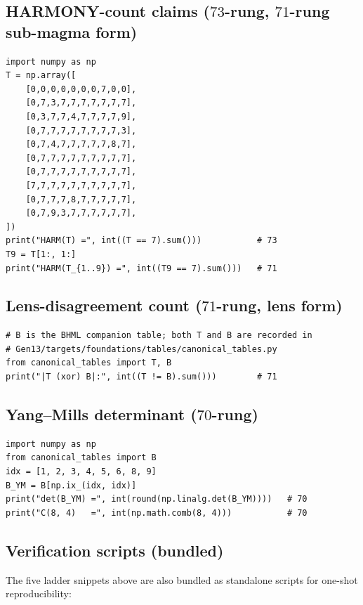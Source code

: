\documentclass[11pt,reqno]{amsart}
\theoremstyle{definition}
\begin{document}
\subsection{HARMONY-count claims ($73$-rung, $71$-rung sub-magma form)}
\label{subsec:harm-snippet}

\begin{lstlisting}[style=plainpy]
import numpy as np
T = np.array([
    [0,0,0,0,0,0,0,7,0,0],
    [0,7,3,7,7,7,7,7,7,7],
    [0,3,7,7,4,7,7,7,7,9],
    [0,7,7,7,7,7,7,7,7,3],
    [0,7,4,7,7,7,7,7,8,7],
    [0,7,7,7,7,7,7,7,7,7],
    [0,7,7,7,7,7,7,7,7,7],
    [7,7,7,7,7,7,7,7,7,7],
    [0,7,7,7,8,7,7,7,7,7],
    [0,7,9,3,7,7,7,7,7,7],
])
print("HARM(T) =", int((T == 7).sum()))           # 73
T9 = T[1:, 1:]
print("HARM(T_{1..9}) =", int((T9 == 7).sum()))   # 71
\end{lstlisting}

\subsection{Lens-disagreement count ($71$-rung, lens form)}
\label{subsec:lens-snippet}

\begin{lstlisting}[style=plainpy]
# B is the BHML companion table; both T and B are recorded in
# Gen13/targets/foundations/tables/canonical_tables.py
from canonical_tables import T, B
print("|T (xor) B|:", int((T != B).sum()))        # 71
\end{lstlisting}

\subsection{Yang--Mills determinant ($70$-rung)}
\label{subsec:ym-det-snippet}

\begin{lstlisting}[style=plainpy]
import numpy as np
from canonical_tables import B
idx = [1, 2, 3, 4, 5, 6, 8, 9]
B_YM = B[np.ix_(idx, idx)]
print("det(B_YM) =", int(round(np.linalg.det(B_YM))))   # 70
print("C(8, 4)   =", int(np.math.comb(8, 4)))           # 70
\end{lstlisting}

\subsection{Verification scripts (bundled)}

The five ladder snippets above are also bundled as standalone scripts
for one-shot reproducibility:
\end{document}
